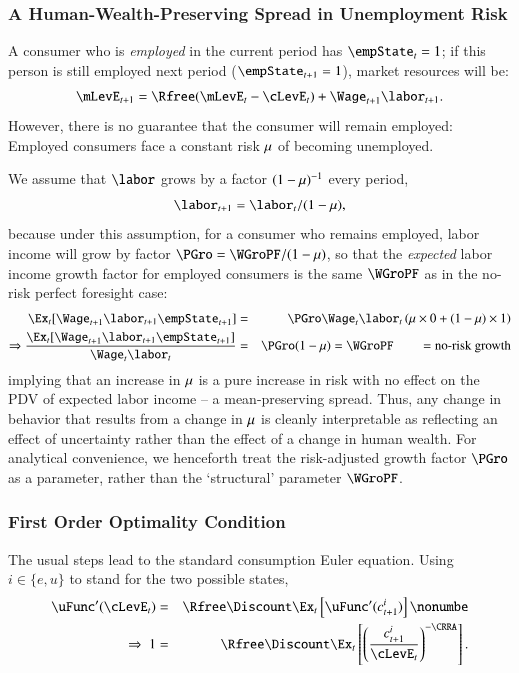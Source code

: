 \documentclass[titlepage,abstract]{\econtex}\newcommand{\texname}{ctDiscrete}
\begin{document}
\subsubsection{A Human-Wealth-Preserving Spread in Unemployment Risk}
A consumer who is \textit{employed} in the current period has $\empState_{t}=1$; if this person is still employed next period ($\empState_{t+1}=1$), market resources will be:
\begin{equation}
\mLevE_{t+1} = \Rfree(\mLevE_{t}-\cLevE_{t})+\Wage_{t+1}\labor_{t+1} \label{eq:Metp1}
.
\end{equation}
However, there is no guarantee that the consumer will remain employed: Employed consumers face a constant risk $\mu$ of becoming unemployed.  

We assume that $\labor$ grows by a factor $(1-\mu)^{-1}$ every period,
\begin{equation}
\labor_{t+1} =    \labor_{t}/(1-\urate) 
\label{eq:meanPreserve}
,
\end{equation}
because under this assumption, for a consumer who remains employed, labor income will grow by factor $\PGro=\WGroPF/(1-\urate)$,
so that the \textit{expected} labor income growth factor for employed consumers is the same $\WGroPF$ as in the no-risk perfect foresight case:
\begin{eqnarray*}
   \Ex_{t}[\Wage_{t+1}\labor_{t+1}\empState_{t+1}] 
   & = &  
   \PGro \Wage_{t} \labor_{t} \left(\urate \times 0 + (1-\urate) \times 1 \right)
\\ 
\Rightarrow 
\frac{\Ex_{t}[\Wage_{t+1}\labor_{t+1}\empState_{t+1}]}{\Wage_{t} \labor_{t}} &  = & \PGro (1-\urate) = \WGroPF \hspace{20pt} = \text{no-risk growth}
\end{eqnarray*}
implying that an increase in $\mu$ is a pure increase in risk with
no effect on the PDV of expected labor income -- a mean-preserving
spread.  Thus, any change in behavior that
results from a change in $\mu$ is cleanly interpretable as
reflecting an effect of uncertainty rather than the effect of a change
in human wealth. For analytical convenience, we henceforth treat the risk-adjusted growth factor $\PGro$ as a parameter, rather than the `structural' parameter $\WGroPF$.


\subsubsection{First Order Optimality Condition}
The usual steps lead to the standard consumption Euler equation. Using $i \in \{e,u\}$ to stand for the two possible states,
\begin{eqnarray}
     \uFunc^{\prime}(\cLevE_{t}) & = & \Rfree\Discount \Ex_{t}\left[\uFunc^{\prime}(\cLev^{i}_{t+1}) \right] \nonumbe
\\
\Rightarrow \ 
   1         & = & \Rfree\Discount \Ex_{t}\left[\left(\frac{\cLev^{i}_{t+1}}{\cLevE_{t}}\right)^{-\CRRA} \right]
.
\end{eqnarray}
\end{document}
